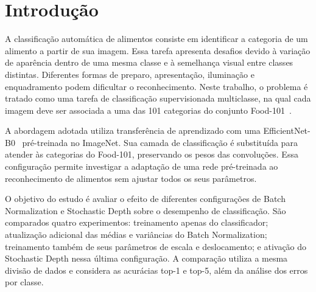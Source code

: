 \section{Introdução}
\label{sec:introducao}

A classificação automática de alimentos consiste em identificar a categoria
de um alimento a partir de sua imagem. Essa tarefa apresenta desafios devido
à variação de aparência dentro de uma mesma classe e à semelhança visual entre
classes distintas. Diferentes formas de preparo, apresentação, iluminação e
enquadramento podem dificultar o reconhecimento. Neste trabalho, o problema
é tratado como uma tarefa de classificação supervisionada multiclasse, na qual
cada imagem deve ser associada a uma das 101 categorias do conjunto
Food-101~\cite{bossard2014food101}.

A abordagem adotada utiliza transferência de aprendizado com uma
EfficientNet-B0~\cite{tan2019efficientnet} pré-treinada no ImageNet. Sua camada
de classificação é substituída para atender às categorias do Food-101,
preservando os pesos das convoluções. Essa configuração permite investigar
a adaptação de uma rede pré-treinada ao reconhecimento de alimentos sem
ajustar todos os seus parâmetros.

O objetivo do estudo é avaliar o efeito de diferentes configurações de
Batch Normalization e Stochastic Depth sobre o desempenho de classificação.
São comparados quatro experimentos: treinamento apenas do classificador;
atualização adicional das médias e variâncias do Batch Normalization;
treinamento também de seus parâmetros de escala e deslocamento; e ativação
do Stochastic Depth nessa última configuração. A comparação utiliza a mesma
divisão de dados e considera as acurácias top-1 e top-5, além da análise dos
erros por classe.
